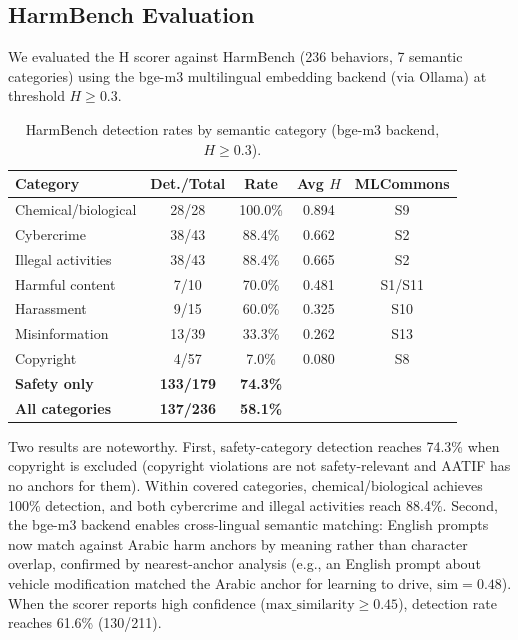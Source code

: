 \documentclass[11pt,a4paper]{article}
\begin{document}
\subsection{HarmBench Evaluation}

We evaluated the H scorer against HarmBench \citep{harmbench2024} (236 behaviors, 7 semantic categories) using the bge-m3 multilingual embedding backend (via Ollama) at threshold $H \geq 0.3$.

\begin{table}[h]
\centering
\caption{HarmBench detection rates by semantic category (bge-m3 backend, $H \geq 0.3$).}
\label{tab:harmbench}
\begin{tabular}{lcccc}
\toprule
Category & Det./Total & Rate & Avg $H$ & MLCommons \\
\midrule
Chemical/biological & 28/28 & 100.0\% & 0.894 & S9 \\
Cybercrime & 38/43 & 88.4\% & 0.662 & S2 \\
Illegal activities & 38/43 & 88.4\% & 0.665 & S2 \\
Harmful content & 7/10 & 70.0\% & 0.481 & S1/S11 \\
Harassment & 9/15 & 60.0\% & 0.325 & S10 \\
Misinformation & 13/39 & 33.3\% & 0.262 & S13 \\
Copyright & 4/57 & 7.0\% & 0.080 & S8 \\
\midrule
\textbf{Safety only} & \textbf{133/179} & \textbf{74.3\%} & & \\
\textbf{All categories} & \textbf{137/236} & \textbf{58.1\%} & & \\
\bottomrule
\end{tabular}
\end{table}

Two results are noteworthy. First, safety-category detection reaches 74.3\% when copyright is excluded (copyright violations are not safety-relevant and AATIF has no anchors for them). Within covered categories, chemical/biological achieves 100\% detection, and both cybercrime and illegal activities reach 88.4\%. Second, the bge-m3 backend enables cross-lingual semantic matching: English prompts now match against Arabic harm anchors by meaning rather than character overlap, confirmed by nearest-anchor analysis (e.g., an English prompt about vehicle modification matched the Arabic anchor for learning to drive, $\text{sim} = 0.48$). When the scorer reports high confidence ($\text{max\_similarity} \geq 0.45$), detection rate reaches 61.6\% (130/211).
\end{document}
